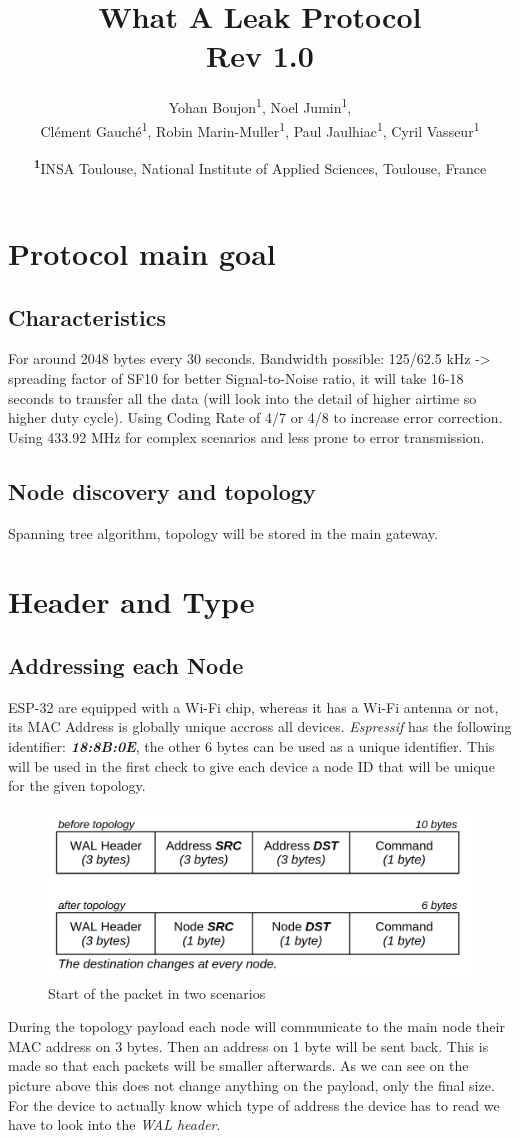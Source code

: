 \documentclass[
	a4paper,
	10pt,
	unnumberedsections,
	twoside,
]{LTJournalArticle}
\title{What A Leak Protocol\\ Rev 1.0}
\author{
	Yohan Boujon\textsuperscript{1}, Noel Jumin\textsuperscript{1}, \\ Clément Gauché\textsuperscript{1}, Robin Marin-Muller\textsuperscript{1}, Paul Jaulhiac\textsuperscript{1}, Cyril Vasseur\textsuperscript{1}
}
\date{\footnotesize\textsuperscript{\textbf{1}}INSA Toulouse, National Institute of Applied Sciences, Toulouse, France}
\begin{document}
\maketitle
\section{Protocol main goal} \label{sec:constraints}
\subsection{Characteristics}
For around 2048 bytes every 30 seconds.
Bandwidth possible: 125/62.5 kHz -> spreading factor of SF10 for better Signal-to-Noise ratio, it will take 16-18 seconds to transfer all the data (will look into the detail of higher airtime so higher duty cycle). Using Coding Rate of 4/7 or 4/8 to increase error correction. Using 433.92 MHz for complex scenarios and less prone to error transmission.
\subsection{Node discovery and topology}
Spanning tree algorithm, topology will be stored in the main gateway.

\section{Header and Type}
\subsection{Addressing each Node}
ESP-32 are equipped with a Wi-Fi chip, whereas it has a Wi-Fi antenna or not, its MAC Address is globally unique accross all devices. \textit{Espressif} has the following identifier: \textbf{\textit{18:8B:0E}}, the other 6 bytes can be used as a unique identifier. This will be used in the first check to give each device a node ID that will be unique for the given topology.
\begin{figure}[H]
    \centering
    \includegraphics[width=0.9\linewidth]{img/wal_header.png}
    \caption{Start of the packet in two scenarios}
    \label{fig:wal_header}
\end{figure}
During the topology payload each node will communicate to the main node their MAC address on 3 bytes. Then an address on 1 byte will be sent back. This is made so that each packets will be smaller afterwards. As we can see on the picture above this does not change anything on the payload, only the final size. For the device to actually know which type of address the device has to read we have to look into the \textit{WAL header}.
\end{document}
